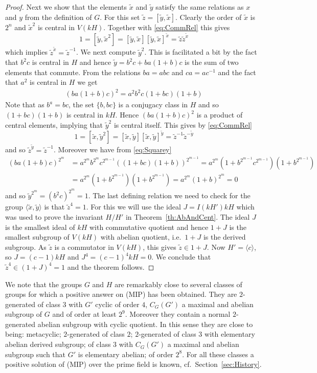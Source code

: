\documentclass[11pt, a4paper]{amsart}
\theoremstyle{definition}
\begin{document}
\begin{proof}
Next we show that the elements $\tilde{x}$ and $\tilde{y}$ satisfy the same relations as $x$ and $y$ from the definition of $G$. For this set $\tilde{z} = [\tilde{y},\tilde{x}]$. Clearly the order of $\tilde{x}$ is $2^n$ and $\tilde{x}^2$ is central in $V(kH)$. Together with \eqref{eq:CommRel} this gives
\[1 = [\tilde{y}, \tilde{x}^2 ] = [\tilde{y}, \tilde{x}][\tilde{y},\tilde{x}]^{\tilde{x}} = \tilde{z} \tilde{z}^{\tilde{x}}  \]
which implies $\tilde{z}^{\tilde{x}} = \tilde{z}^{-1}$. We next compute $\tilde{y}^2$. This is facilitated a bit by the fact that $b^2c$ is central in $H$ and hence $\tilde{y} = b^2c + ba(1+b)c$ is the sum of two elements that commute. From the relations $ba = abc$ and $ca = ac^{-1}$ and the fact that $a^2$ is central in $H$ we get
\begin{align}\label{eq:Squarey}
(ba(1+b)c)^2 = a^2b^2c(1+bc)(1+b)
\end{align}
Note that as $b^a = bc$, the set $\{ b,bc \}$ is a conjugacy class in $H$ and so $(1+bc)(1+b)$ is central in $kH$. Hence $(ba(1+b)c)^2$ is a product of central elements, implying that $\tilde{y}^2$ is central itself. This gives by \eqref{eq:CommRel}
\[1 = [\tilde{x}, \tilde{y}^2] = [\tilde{x},\tilde{y}][\tilde{x},\tilde{y}]^{\tilde{y}} = \tilde{z}^{-1}\tilde{z}^{-\tilde{y}} \]
and so $\tilde{z}^{\tilde{y}} = \tilde{z}^{-1}$. Moreover we have from \eqref{eq:Squarey}
\begin{align*}
(ba(1+b)c)^{2^m} &= a^{2^m}b^{2^m}c^{2^{m-1}}((1+bc)(1+b))^{2^{m-1}} = a^{2^m}(1+b^{2^{m-1}}c^{2^{m-1}})(1+b^{2^{m-1}}) \\
 &=  a^{2^m}(1+b^{2^{m-1}})(1+b^{2^{m-1}}) = a^{2^m}(1+b)^{2^m} = 0  
\end{align*}
and so $\tilde{y}^{2^m} = (b^2c)^{2^m} = 1$. The last defining relation we need to check for the group $\langle \tilde{x}, \tilde{y} \rangle$ is that $\tilde{z}^4 = 1$. For this we will use the ideal $J = I(kH')kH$ which was used to prove the invariant $H/H'$ in Theorem~\ref{th:AbAndCent}. The ideal $J$ is the smallest ideal of $kH$ with commutative quotient and hence $1+J$ is the smallest subgroup of $V(kH)$ with abelian quotient, i.e.\ $1+J$ is the derived subgroup. As $\tilde{z}$ is a commutator in $V(kH)$, this gives $\tilde{z} \in 1+J$. Now $H' = \langle c \rangle$, so $J = (c-1)kH$ and $J^4 = (c-1)^4kH = 0$. We conclude that $\tilde{z}^4 \in (1+J)^4 = 1$ and the theorem follows. 
\end{proof}

We note that the groups $G$ and $H$ are remarkably close to several classes of groups for which a positive answer on (MIP) has been obtained. They are $2$-generated of class $3$ with $G'$ cyclic of order $4$, $C_G(G')$ a maximal and abelian subgroup of $G$ and of order at least $2^9$. Moreover they contain a normal $2$-generated abelian subgroup with cyclic quotient. In this sense they are close to being: metacyclic; $2$-generated of class $2$; $2$-generated of class $3$ with elementary abelian derived subgroup; of class $3$ with $C_G(G')$ a maximal and abelian subgroup such that $G'$ is elementary abelian; of order $2^8$. For all these classes a positive solution of (MIP) over the prime field is known, cf.\ Section~\ref{sec:History}.
\end{document}
